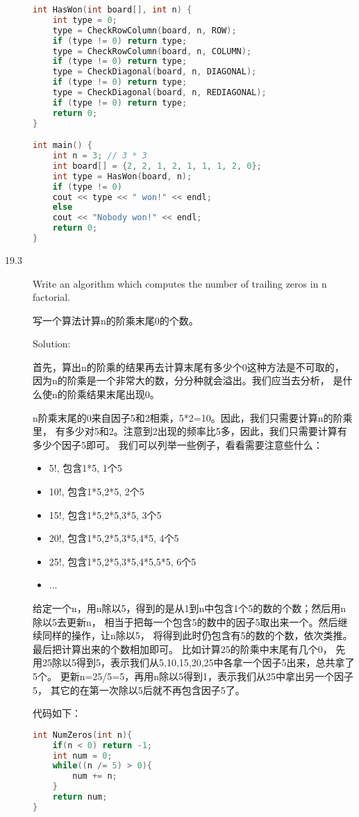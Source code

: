 \begin{description}
\begin{lstlisting}[language=C++]
int HasWon(int board[], int n) {
    int type = 0;
    type = CheckRowColumn(board, n, ROW);
    if (type != 0) return type;
    type = CheckRowColumn(board, n, COLUMN);
    if (type != 0) return type;
    type = CheckDiagonal(board, n, DIAGONAL);
    if (type != 0) return type;
    type = CheckDiagonal(board, n, REDIAGONAL);
    if (type != 0) return type;
    return 0;
}

int main() {
    int n = 3; // 3 * 3
    int board[] = {2, 2, 1, 2, 1, 1, 1, 2, 0};
    int type = HasWon(board, n);
    if (type != 0)
	cout << type << " won!" << endl;
    else 
	cout << "Nobody won!" << endl;
    return 0;
}
\end{lstlisting}
%


\item[19.3] Write an algorithm which computes the number of trailing zeros in n factorial.

写一个算法计算n的阶乘末尾0的个数。

Solution: 

首先，算出n的阶乘的结果再去计算末尾有多少个0这种方法是不可取的， 因为n的阶乘是一个非常大的数，分分种就会溢出。我们应当去分析， 是什么使n的阶乘结果末尾出现0。

n阶乘末尾的0来自因子5和2相乘，5*2=10。因此，我们只需要计算n的阶乘里， 有多少对5和2。注意到2出现的频率比5多，因此，我们只需要计算有多少个因子5即可。 我们可以列举一些例子，看看需要注意些什么：
\begin{itemize}
  \itemsep=-3pt
\item  5!, 包含1*5, 1个5
\item 10!, 包含1*5,2*5, 2个5
\item 15!, 包含1*5,2*5,3*5, 3个5
\item 20!, 包含1*5,2*5,3*5,4*5, 4个5
\item 25!, 包含1*5,2*5,3*5,4*5,5*5, 6个5
\item ...
\end{itemize}
给定一个n，用n除以5，得到的是从1到n中包含1个5的数的个数；然后用n除以5去更新n， 相当于把每一个包含5的数中的因子5取出来一个。然后继续同样的操作，让n除以5， 将得到此时仍包含有5的数的个数，依次类推。最后把计算出来的个数相加即可。 比如计算25的阶乘中末尾有几个0， 先用25除以5得到5，表示我们从5,10,15,20,25中各拿一个因子5出来，总共拿了5个。 更新n=25/5=5，再用n除以5得到1，表示我们从25中拿出另一个因子5， 其它的在第一次除以5后就不再包含因子5了。

代码如下：
\begin{lstlisting}[language=C++]
int NumZeros(int n){
    if(n < 0) return -1;
    int num = 0;
    while((n /= 5) > 0){
        num += n;
    }
    return num;
}
\end{lstlisting}


\end{description}
